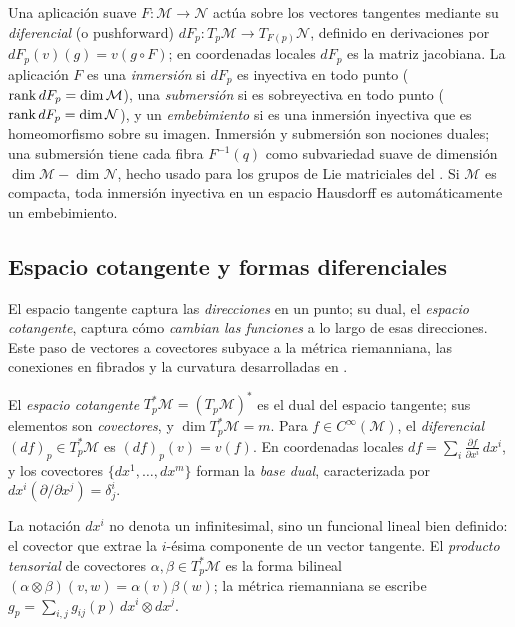 Una aplicaci\'on suave $F : \mathcal{M} \to \mathcal{N}$ act\'ua sobre los vectores
tangentes mediante su \emph{diferencial} (o pushforward) $dF_p : T_p\mathcal{M} \to
T_{F(p)}\mathcal{N}$, definido en derivaciones por $dF_p(v)(g) = v(g\circ F)$; en
coordenadas locales $dF_p$ es la matriz jacobiana. La aplicaci\'on $F$ es una
\emph{inmersi\'on} si $dF_p$ es inyectiva en todo punto ($\operatorname{rank} dF_p =
\dim\mathcal{M}$), una \emph{submersi\'on} si es sobreyectiva en todo punto
($\operatorname{rank} dF_p = \dim\mathcal{N}$), y un \emph{embebimiento} si es una inmersi\'on
inyectiva que es homeomorfismo sobre su imagen. Inmersi\'on y submersi\'on son
nociones duales; una submersi\'on tiene cada fibra $F^{-1}(q)$ como subvariedad
suave de dimensi\'on $\dim\mathcal{M} - \dim\mathcal{N}$, hecho usado para los
grupos de Lie matriciales del . Si $\mathcal{M}$ es
compacta, toda inmersi\'on inyectiva en un espacio Hausdorff es autom\'aticamente un
embebimiento.

\subsection{Espacio cotangente y formas diferenciales}
\label{sec:found:cotangent}

El espacio tangente captura las \emph{direcciones} en un punto; su dual, el
\emph{espacio cotangente}, captura c\'omo \emph{cambian las funciones} a lo largo de
esas direcciones. Este paso de vectores a covectores subyace a la m\'etrica
riemanniana, las conexiones en fibrados y la curvatura desarrolladas en
.

\begin{definition}
\label{def:found:cotangent}
El \emph{espacio cotangente} $T_p^*\mathcal{M} = (T_p\mathcal{M})^*$ es el dual del
espacio tangente; sus elementos son \emph{covectores}, y $\dim T_p^*\mathcal{M} =
m$. Para $f \in C^\infty(\mathcal{M})$, el \emph{diferencial} $(df)_p \in
T_p^*\mathcal{M}$ es $(df)_p(v) = v(f)$. En coordenadas locales $df = \sum_i
\frac{\partial f}{\partial x^i}\, dx^i$, y los covectores $\{dx^1, \ldots, dx^m\}$
forman la \emph{base dual}, caracterizada por $dx^i(\partial/\partial x^j) =
\delta^i_j$.
\end{definition}

La notaci\'on $dx^i$ no denota un infinitesimal, sino un funcional lineal bien
definido: el covector que extrae la $i$-\'esima componente de un vector tangente. El
\emph{producto tensorial} de covectores $\alpha, \beta \in T_p^*\mathcal{M}$ es la
forma bilineal $(\alpha \otimes \beta)(v, w) = \alpha(v)\beta(w)$; la m\'etrica
riemanniana se escribe $g_p = \sum_{i,j} g_{ij}(p)\, dx^i \otimes dx^j$.

